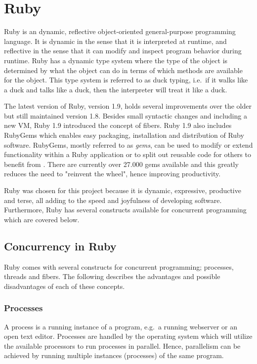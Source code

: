 \section{Ruby} %
\label{sec:ruby}

Ruby is an dynamic, reflective object-oriented general-purpose programming
language. It is dynamic in the sense that it is interpreted at runtime, and
reflective in the sense that it can modify and inspect program behavior during
runtime.  Ruby has a dynamic type system where the type of the object is
determined by what the object can do in terms of which methods are available
for the object. This type system is referred to as duck typing, i.e.\ if it
walks like a duck and talks like a duck, then the interpreter will treat it
like a duck.

The latest version of Ruby, version 1.9, holds several improvements over the
older but still maintained version 1.8. Besides small syntactic changes and
including a new VM, Ruby 1.9 introduced the concept of fibers. Ruby 1.9 also
includes RubyGems which enables easy packaging, installation and distribution
of Ruby software. RubyGems, mostly referred to as \textit{gems}, can be used
to modify or extend functionality within a Ruby application or to split out
reusable code for others to benefit from \cite{rubygems}. There are currently
over 27.000 gems available and this greatly reduces the need to "reinvent the
wheel", hence improving productivity. 

Ruby was chosen for this project because it is dynamic, expressive, productive
and terse, all adding to the speed and joyfulness of developing software.
Furthermore, Ruby has several constructs available for concurrent programming
which are covered below.

\subsection{Concurrency in Ruby}
Ruby comes with several constructs for concurrent programming; processes, threads
and fibers. The following describes the advantages and possible disadvantages
of each of these concepts.

\subsubsection{Processes}
A process is a running instance of a program, e.g.\ a running webserver or an
open text editor. Processes are handled by the operating system which
will utilize the available processors to run processes in parallel.
Hence, parallelism can be achieved by running multiple instances (processes) of
the same program.

